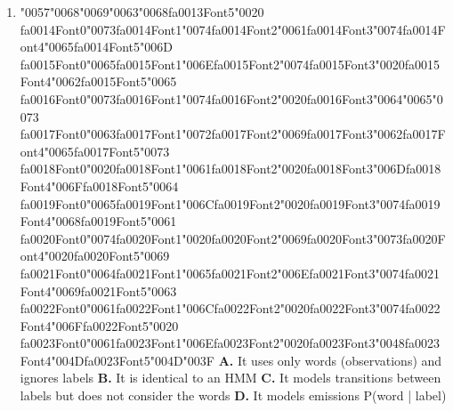 \documentclass[11pt]{article}
\begin{document}
\begin{enumerate}[leftmargin=*]
  \item {\char"0057}{\char"0068}{\char"0069}{\char"0063}{\char"0068}{\csname fa0013Font5\endcsname\char"0020} {\csname fa0014Font0\endcsname\char"0073}{\csname fa0014Font1\endcsname\char"0074}{\csname fa0014Font2\endcsname\char"0061}{\csname fa0014Font3\endcsname\char"0074}{\csname fa0014Font4\endcsname\char"0065}{\csname fa0014Font5\endcsname\char"006D} {\csname fa0015Font0\endcsname\char"0065}{\csname fa0015Font1\endcsname\char"006E}{\csname fa0015Font2\endcsname\char"0074}{\csname fa0015Font3\endcsname\char"0020}{\csname fa0015Font4\endcsname\char"0062}{\csname fa0015Font5\endcsname\char"0065} {\csname fa0016Font0\endcsname\char"0073}{\csname fa0016Font1\endcsname\char"0074}{\csname fa0016Font2\endcsname\char"0020}{\csname fa0016Font3\endcsname\char"0064}{\char"0065}{\char"0073} {\csname fa0017Font0\endcsname\char"0063}{\csname fa0017Font1\endcsname\char"0072}{\csname fa0017Font2\endcsname\char"0069}{\csname fa0017Font3\endcsname\char"0062}{\csname fa0017Font4\endcsname\char"0065}{\csname fa0017Font5\endcsname\char"0073} {\csname fa0018Font0\endcsname\char"0020}{\csname fa0018Font1\endcsname\char"0061}{\csname fa0018Font2\endcsname\char"0020}{\csname fa0018Font3\endcsname\char"006D}{\csname fa0018Font4\endcsname\char"006F}{\csname fa0018Font5\endcsname\char"0064} {\csname fa0019Font0\endcsname\char"0065}{\csname fa0019Font1\endcsname\char"006C}{\csname fa0019Font2\endcsname\char"0020}{\csname fa0019Font3\endcsname\char"0074}{\csname fa0019Font4\endcsname\char"0068}{\csname fa0019Font5\endcsname\char"0061} {\csname fa0020Font0\endcsname\char"0074}{\csname fa0020Font1\endcsname\char"0020}{\csname fa0020Font2\endcsname\char"0069}{\csname fa0020Font3\endcsname\char"0073}{\csname fa0020Font4\endcsname\char"0020}{\csname fa0020Font5\endcsname\char"0069} {\csname fa0021Font0\endcsname\char"0064}{\csname fa0021Font1\endcsname\char"0065}{\csname fa0021Font2\endcsname\char"006E}{\csname fa0021Font3\endcsname\char"0074}{\csname fa0021Font4\endcsname\char"0069}{\csname fa0021Font5\endcsname\char"0063} {\csname fa0022Font0\endcsname\char"0061}{\csname fa0022Font1\endcsname\char"006C}{\csname fa0022Font2\endcsname\char"0020}{\csname fa0022Font3\endcsname\char"0074}{\csname fa0022Font4\endcsname\char"006F}{\csname fa0022Font5\endcsname\char"0020} {\csname fa0023Font0\endcsname\char"0061}{\csname fa0023Font1\endcsname\char"006E}{\csname fa0023Font2\endcsname\char"0020}{\csname fa0023Font3\endcsname\char"0048}{\csname fa0023Font4\endcsname\char"004D}{\csname fa0023Font5\endcsname\char"004D}{\char"003F}
    \textbf{A.} It uses only words (observations) and ignores labels
    \textbf{B.} It is identical to an HMM
    \textbf{C.} It models transitions between labels but does not consider the words
    \textbf{D.} It models emissions P(word | label)


\end{enumerate}
\end{document}
